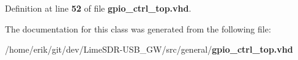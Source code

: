 Definition at line {\bf 52} of file {\bf gpio\+\_\+ctrl\+\_\+top.\+vhd}.



The documentation for this class was generated from the following file\+:\begin{DoxyCompactItemize}
\item 
/home/erik/git/dev/\+Lime\+S\+D\+R-\/\+U\+S\+B\+\_\+\+G\+W/src/general/{\bf gpio\+\_\+ctrl\+\_\+top.\+vhd}\end{DoxyCompactItemize}
